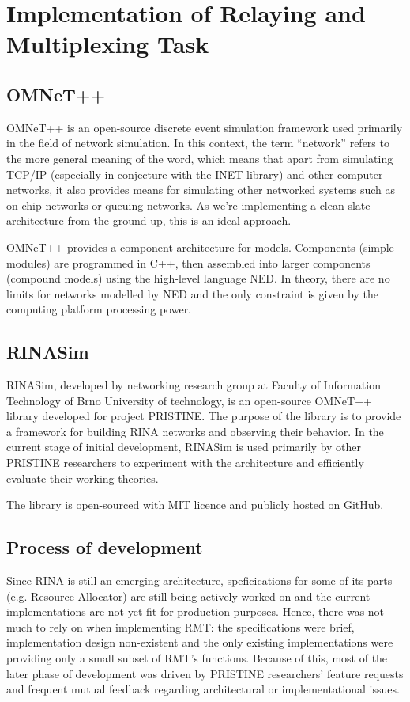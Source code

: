 \chapter{Implementation of Relaying and Multiplexing Task}\label{implementation}

    \section{OMNeT++}

        OMNeT++ is an open-source discrete event simulation framework used primarily in the field of network simulation. In this context, the term ``network'' refers to the more general meaning of the word, which means that apart from simulating TCP/IP (especially in conjecture with the INET library) and other computer networks, it also provides means for simulating other networked systems such as on-chip networks or queuing networks. As we're implementing a clean-slate architecture from the ground up, this is an ideal approach.

        OMNeT++ provides a component architecture for models. Components (simple modules) are programmed in C++, then assembled into larger components (compound models) using the high-level language NED. In theory, there are no limits for networks modelled by NED and the only constraint is given by the computing platform processing power.

    \section{RINASim}

        RINASim, developed by networking research group at Faculty of Information Technology of Brno University of technology, is an open-source OMNeT++ library developed for project PRISTINE. The purpose of the library is to provide a framework for building RINA networks and observing their behavior. In the current stage of initial development, RINASim is used primarily by other PRISTINE researchers to experiment with the architecture and efficiently evaluate their working theories.

        The library is open-sourced with MIT licence and publicly hosted on GitHub.

    \section{Process of development}

        Since RINA is still an emerging architecture, speficications for some of its parts (e.g. Resource Allocator) are still being actively worked on and the current implementations are not yet fit for production purposes. Hence, there was not much to rely on when implementing RMT: the specifications were brief, implementation design non-existent and the only existing implementations were providing only a small subset of RMT's functions. Because of this, most of the later phase of development was driven by PRISTINE researchers' feature requests and frequent mutual feedback regarding architectural or implementational issues.

